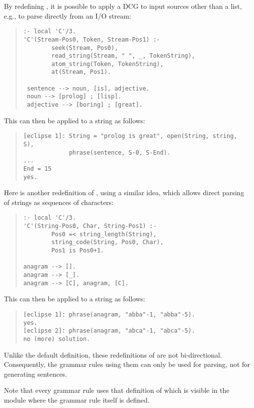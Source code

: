 By redefining , it is possible to apply a DCG to
input sources other than a list, e.g., to parse directly from an I/O stream:
\begin{quote}
\begin{verbatim}
:- local 'C'/3.
'C'(Stream-Pos0, Token, Stream-Pos1) :-
        seek(Stream, Pos0),
        read_string(Stream, " ", _, TokenString),
        atom_string(Token, TokenString),
        at(Stream, Pos1).

 sentence --> noun, [is], adjective.
 noun --> [prolog] ; [lisp].
 adjective --> [boring] ; [great].
\end{verbatim}
\end{quote}
This can then be applied to a string as follows:
\begin{quote}
\begin{verbatim}
[eclipse 1]: String = "prolog is great", open(String, string, S),
             phrase(sentence, S-0, S-End).
...
End = 15
yes.
\end{verbatim}
\end{quote}
Here is another redefinition of , using a similar idea, which
allows  direct parsing of {\eclipse} strings as sequences of characters:
\begin{quote}
\begin{verbatim}
:- local 'C'/3.
'C'(String-Pos0, Char, String-Pos1) :-
        Pos0 =< string_length(String),
        string_code(String, Pos0, Char),
        Pos1 is Pos0+1.

anagram --> [].
anagram --> [_].
anagram --> [C], anagram, [C].
\end{verbatim}
\end{quote}
This can then be applied to a string as follows:
\begin{quote}
\begin{verbatim}
[eclipse 1]: phrase(anagram, "abba"-1, "abba"-5).
yes.
[eclipse 2]: phrase(anagram, "abca"-1, "abca"-5).
no (more) solution.
\end{verbatim}
\end{quote}
Unlike the default definition, these redefinitions of  are not
bi-directional.
Consequently, the grammar rules using them can only be used for parsing,
not for generating sentences.

Note that every grammar rule uses that definition of  which is
visible in
the module where the grammar rule itself is defined.

